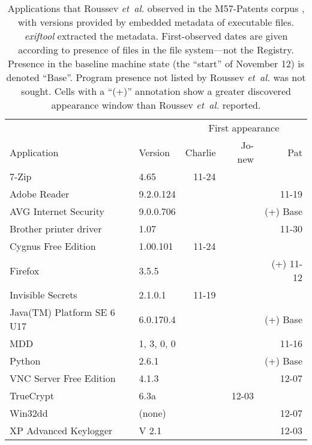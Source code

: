 \documentclass[11pt]{ucthesis}
\theoremstyle{plain}
\theoremstyle{definition}
\newcommand{\etal}{\emph{et~al.}\xspace}
\newcommand{\exiftool}{\emph{exiftool}\xspace}
\begin{document}
\begin{table}[htp]
\caption{\label{tbl:m57apps:digging}Applications that Roussev \etal observed in the M57-Patents corpus \cite[pages S67--S68]{roussev:dfrws12}, with versions provided by embedded metadata of executable files.  \exiftool \cite{harvey:exiftool} extracted the metadata.  First-observed dates are given according to presence of files in the file system---not the Registry.  Presence in the baseline machine state (the ``start'' of November 12) is denoted ``Base''.  Program presence not listed by Roussev \etal was not sought.  Cells with a ``(+)'' annotation show a greater discovered appearance window than Roussev \etal reported.}
\begin{center}
\begin{small}
\begin{tabular}{llrrr}
\toprule
 & & \multicolumn{3}{c}{First appearance} \\
Application & Version & Charlie & Jo-new & Pat \\
\midrule
7-Zip & 4.65 & 11-24 & & \\
Adobe Reader & 9.2.0.124 & & & 11-19 \\
AVG Internet Security & 9.0.0.706 & & & (+) Base \\
Brother printer driver & 1.07 & & & 11-30 \\
Cygnus Free Edition & 1.00.101 & 11-24 & & \\
Firefox & 3.5.5 & & & (+) 11-12 \\
Invisible Secrets & 2.1.0.1 & 11-19 & & \\
Java(TM) Platform SE 6 U17 & 6.0.170.4 & & & (+) Base \\
MDD & 1, 3, 0, 0 & & & 11-16 \\
Python & 2.6.1 & & & (+) Base \\
VNC Server Free Edition & 4.1.3 & & & 12-07 \\
TrueCrypt & 6.3a & & 12-03 & \\
Win32dd & (none) & & & 12-07 \\
XP Advanced Keylogger & V 2.1 & & & 12-03 \\
\bottomrule
\end{tabular}
\end{small}
\end{center}
\end{table}%
\end{document}
